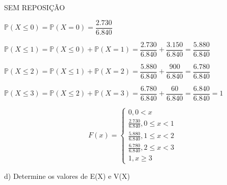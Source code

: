 \documentclass[12pt,a4paper]{article}
\begin{document}
\vspace{1cm}
SEM REPOSIÇÃO
\begin{center}
	\vspace{0.25cm}
	$\mathbb{P}(X\leq{0}) = \mathbb{P}(X=0) = \dfrac{2.730}{6.840}$
	
	\vspace{0.5cm}
	$\mathbb{P}(X\leq1) = \mathbb{P}(X\leq{0}) + \mathbb{P}(X=1) = \dfrac{2.730}{6.840} + \dfrac{3.150}{6.840} = \dfrac{5.880}{6.840}$
	
	\vspace{0.5cm}
	$\mathbb{P}(X\leq{2}) = \mathbb{P}(X\leq1) + \mathbb{P}(X=2) = \dfrac{5.880}{6.840} + \dfrac{900}{6.840} = \dfrac{6.780}{6.840}$
	
	\vspace{0.5cm}
	$\mathbb{P}(X\leq{3}) = \mathbb{P}(X\leq{2}) + \mathbb{P}(X=3) = \dfrac{6.780}{6.840} + \dfrac{60}{6.840} = \dfrac{6.840}{6.840} = 1$
	
	\[
	F(x) =
	\begin{cases}
	0, 0 < x \\
	\frac{2.730}{6.840}, 0\leq{x} < 1 \\
	\frac{5.880}{6.840}, 1\leq{x} < 2\\
	\frac{6.780}{6.840}, 2\leq{x} < 3\\
	1,x\geq{3}
	\end{cases}
	\]
	
	\vspace{1cm}
	
\end{center}

d) Determine os valores de E(X) e V(X)
\end{document}
